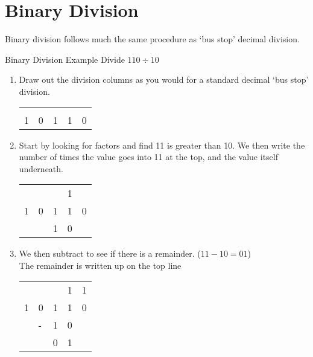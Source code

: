 \section*{Binary Division}
Binary division follows much the same procedure as `bus stop' decimal division. 
\begin{example}{Binary Division Example}
Divide $110 \div 10$
\begin{enumerate}
    \item Draw out the division columns as you would for a standard decimal `bus stop' division.
    \begin{table}[H]
        \centering
        \begin{tabularx}{0.2\textwidth}{XXXXX}
              &  &  &  &  \\
            \cline{3-5}
             1 & 0 & \multicolumn{1}{|X}{1} & 1 & 0 \\
        \end{tabularx}
    \end{table}
    \item Start by looking for factors and find 11 is greater than 10. We then write the number of times the value goes into 11 at the top, and the value itself underneath.
    \begin{table}[H]
        \centering
        \begin{tabularx}{0.2\textwidth}{XXXXX}
              &  &  & 1 &  \\
            \cline{3-5}
             1 & 0 & \multicolumn{1}{|X}{1} & 1 & 0 \\
              &  & 1 & 0 & \\
        \end{tabularx}
    \end{table}
    \item We then subtract to see if there is a remainder. ($11-10=01$)\\
    The remainder is written up on the top line  
    \begin{table}[H]
        \centering
        \begin{tabularx}{0.2\textwidth}{XXXXX}
              &  &  & 1 & 1 \\
            \cline{3-5}
             1 & 0 & \multicolumn{1}{|X}{1} & 1 & 0 \\
              & - & 1 & 0 & \\
            \cline{3-4}
            &  & 0 & 1 & \\
        \end{tabularx}
    \end{table}

\end{enumerate}
\end{example}
